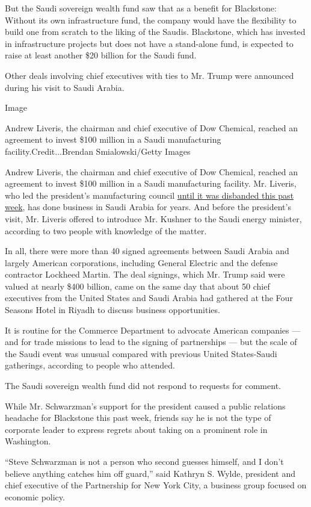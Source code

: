 But the Saudi sovereign wealth fund saw that as a benefit for
Blackstone: Without its own infrastructure fund, the company would have
the flexibility to build one from scratch to the liking of the Saudis.
Blackstone, which has invested in infrastructure projects but does not
have a stand-alone fund, is expected to raise at least another \$20
billion for the Saudi fund.

Other deals involving chief executives with ties to Mr. Trump were
announced during his visit to Saudi Arabia.

Image

Andrew Liveris, the chairman and chief executive of Dow Chemical,
reached an agreement to invest \$100 million in a Saudi manufacturing
facility.Credit...Brendan Smialowski/Getty Images

Andrew Liveris, the chairman and chief executive of Dow Chemical,
reached an agreement to invest \$100 million in a Saudi manufacturing
facility. Mr. Liveris, who led the president's manufacturing council
\href{https://www.nytimes3xbfgragh.onion/2017/08/16/business/trumps-council-ceos.html}{until
it was disbanded this past week}, has done business in Saudi Arabia for
years. And before the president's visit, Mr. Liveris offered to
introduce Mr. Kushner to the Saudi energy minister, according to two
people with knowledge of the matter.

In all, there were more than 40 signed agreements between Saudi Arabia
and largely American corporations, including General Electric and the
defense contractor Lockheed Martin. The deal signings, which Mr. Trump
said were valued at nearly \$400 billion, came on the same day that
about 50 chief executives from the United States and Saudi Arabia had
gathered at the Four Seasons Hotel in Riyadh to discuss business
opportunities.

It is routine for the Commerce Department to advocate American companies
--- and for trade missions to lead to the signing of partnerships ---
but the scale of the Saudi event was unusual compared with previous
United States-Saudi gatherings, according to people who attended.

The Saudi sovereign wealth fund did not respond to requests for comment.

While Mr. Schwarzman's support for the president caused a public
relations headache for Blackstone this past week, friends say he is not
the type of corporate leader to express regrets about taking on a
prominent role in Washington.

``Steve Schwarzman is not a person who second guesses himself, and I
don't believe anything catches him off guard,'' said Kathryn S. Wylde,
president and chief executive of the Partnership for New York City, a
business group focused on economic policy.

